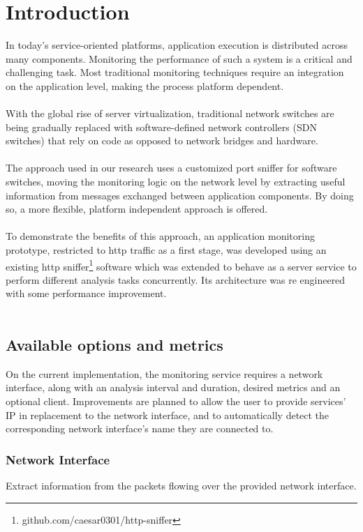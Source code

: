 \documentclass[12pt,hidelinks]{article}
\begin{document}
\section{Introduction}
\vspace{10.5cm}
In today’s service-oriented platforms, application
execution is distributed across many components.
Monitoring the performance of such a system is a
critical and challenging task. Most traditional
monitoring techniques require an integration on the
application level, making the process platform
dependent. \\
\\
With the global rise of server virtualization,
traditional network switches are being gradually
replaced with software-defined network controllers
(SDN switches) that rely on code as opposed to
network bridges and hardware.\\
\\
The approach used in our research uses a customized
port sniffer for software switches, moving the
monitoring logic on the network level by extracting
useful information from messages exchanged
between application components. By doing so, a more
flexible, platform independent approach is offered. \\
\\
To demonstrate the benefits of this approach, an
application monitoring prototype, restricted to http
traffic as a first stage, was developed using an
existing http sniffer\footnote{github.com/caesar0301/http-sniffer} software which was extended
to behave as a server service to perform different
analysis tasks concurrently. Its architecture was re
engineered with some performance improvement. \\
\\
\subsection{Available options and metrics}

On the current implementation, the monitoring service requires a network interface, along with an analysis interval and duration, desired metrics and an optional client.
Improvements are planned to allow the user to provide services' IP in replacement to the network interface, and to automatically detect the corresponding network interface's name they are connected to.

\subsubsection{Network Interface}
Extract information from the packets flowing over the provided network interface.
\end{document}
